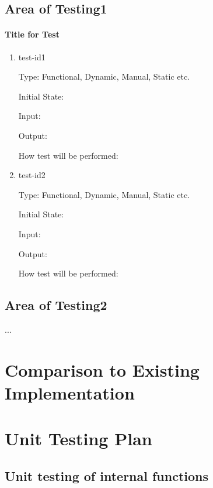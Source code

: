 \documentclass[12pt, titlepage]{article}
\begin{document}
\subsection{Area of Testing1}
		
\paragraph{Title for Test}

\begin{enumerate}

\item{test-id1\\}

Type: Functional, Dynamic, Manual, Static etc.
					
Initial State: 
					
Input: 
					
Output: 
					
How test will be performed: 
					
\item{test-id2\\}

Type: Functional, Dynamic, Manual, Static etc.
					
Initial State: 
					
Input: 
					
Output: 
					
How test will be performed: 

\end{enumerate}

\subsection{Area of Testing2}

...

	
\section{Comparison to Existing Implementation}	
				
\section{Unit Testing Plan}
		
\subsection{Unit testing of internal functions}
		
\end{document}
